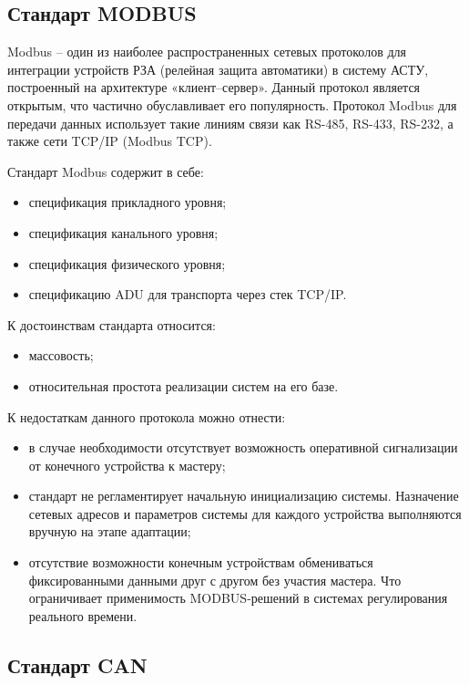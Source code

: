 \subsection{Стандарт MODBUS}

Modbus – один из наиболее распространенных сетевых протоколов для интеграции устройств РЗА (релейная защита автоматики) в систему АСТУ, построенный на архитектуре «клиент–сервер». Данный протокол является открытым, что частично обуславливает его популярность. Протокол Modbus для передачи данных использует такие линиям связи как RS-485, RS-433, RS-232, а также сети TCP/IP (Modbus TCP).

Стандарт Modbus содержит в себе:

\begin{itemize}
 \item спецификация прикладного уровня;
 \item спецификация канального уровня;
 \item спецификация физического уровня;
 \item спецификацию ADU для транспорта через стек TCP/IP.
\end{itemize}

К достоинствам стандарта относится:

\begin{itemize}
 \item массовость;
 \item относительная простота реализации систем на его базе.
\end{itemize}

К недостаткам данного протокола можно отнести:

\begin{itemize}
 \item в случае необходимости отсутствует возможность оперативной сигнализации от конечного устройства к мастеру;
 \item стандарт не регламентирует начальную инициализацию системы. Назначение сетевых адресов и параметров системы для каждого устройства выполняются вручную на этапе адаптации;
 \item отсутствие  возможности  конечным  устройствам  обмениваться фиксированными данными друг с другом без участия мастера. Что ограничивает  применимость MODBUS-решений в системах регулирования реального времени.
\end{itemize}

\subsection{Стандарт CAN}

